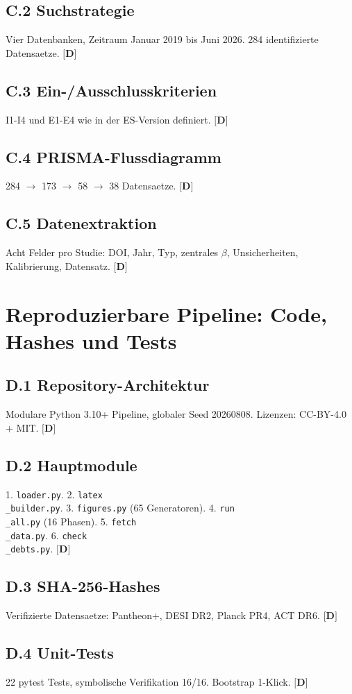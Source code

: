 ﻿\documentclass[11pt,letterpaper]{article}
\begin{document}
\subsection{C.2 Suchstrategie}
Vier Datenbanken, Zeitraum Januar 2019 bis Juni 2026. 284 identifizierte Datensaetze. $\textbf{[D]}$
\subsection{C.3 Ein-/Ausschlusskriterien}
I1-I4 und E1-E4 wie in der ES-Version definiert. $\textbf{[D]}$
\subsection{C.4 PRISMA-Flussdiagramm}
284 $\to$ 173 $\to$ 58 $\to$ 38 Datensaetze. $\textbf{[D]}$
\subsection{C.5 Datenextraktion}
Acht Felder pro Studie: DOI, Jahr, Typ, zentrales $\beta$, Unsicherheiten, Kalibrierung, Datensatz. $\textbf{[D]}$
\section{Reproduzierbare Pipeline: Code, Hashes und Tests}
\subsection{D.1 Repository-Architektur}
Modulare Python 3.10+ Pipeline, globaler Seed 20260808. Lizenzen: CC-BY-4.0 + MIT. $\textbf{[D]}$
\subsection{D.2 Hauptmodule}
1. \texttt{loader.py}. 2. \texttt{latex\\\_builder.py}. 3. \texttt{figures.py} (65 Generatoren). 4. \texttt{run\\\_all.py} (16 Phasen). 5. \texttt{fetch\\\_data.py}. 6. \texttt{check\\\_debts.py}. $\textbf{[D]}$
\subsection{D.3 SHA-256-Hashes}
Verifizierte Datensaetze: Pantheon+, DESI DR2, Planck PR4, ACT DR6. $\textbf{[D]}$
\subsection{D.4 Unit-Tests}
22 pytest Tests, symbolische Verifikation 16/16. Bootstrap 1-Klick. $\textbf{[D]}$
\end{document}
